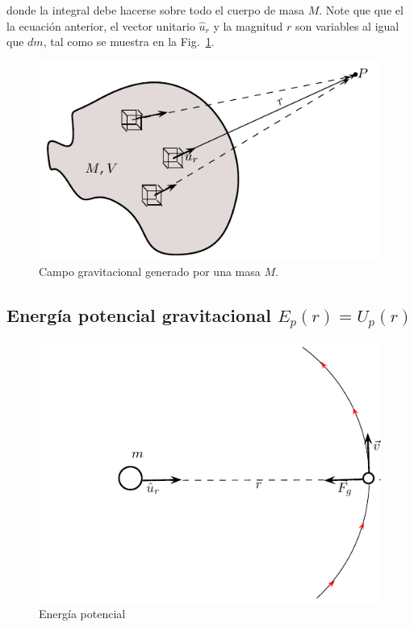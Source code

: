 donde la integral debe hacerse sobre todo el cuerpo de masa $M$. Note que que el la ecuación anterior, el vector unitario $\hat{u}_r$ y la magnitud $r$ son variables al igual que $dm$, tal como se muestra en la Fig.~\ref{fig_distribucion_continuo}. 

\begin{figure}[h]
\begin{center}
\includegraphics[scale=0.9]{gravitacion/figcampogcontinuo}
\caption{Campo gravitacional generado por una masa  $M$.}
\label{fig_distribucion_continuo}
\end{center}
\end{figure}







\subsection{Energía potencial gravitacional $E_p(r)=U_p(r)$}

\begin{figure}[h]
\begin{center}
\includegraphics[scale=0.9]{gravitacion/energiapotencial}
\caption{Energía potencial}
\label{energia potencial}
\end{center}
\end{figure}

